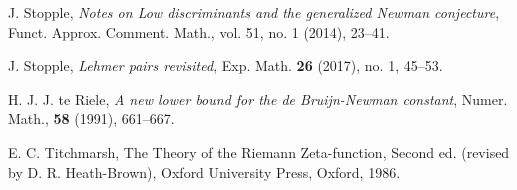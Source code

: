 \documentclass[a4paper,11pt,twoside]{amsart}
\begin{document}
\begin{thebibliography}{99}
J. Stopple, \emph{Notes on Low discriminants and the generalized Newman conjecture}, Funct. Approx. Comment.
Math., vol. 51, no. 1 (2014), 23--41.

J. Stopple, \emph{Lehmer pairs revisited}, Exp. Math. \textbf{26} (2017), no. 1, 45--53. 

H. J. J. te Riele, \emph{A new lower bound for the de Bruijn-Newman constant}, Numer. Math., \textbf{58} (1991), 661--667.

E. C. Titchmarsh, The Theory of the Riemann Zeta-function, Second ed. (revised by D. R. Heath-Brown), Oxford University Press, Oxford, 1986.	


\end{thebibliography} 
\end{document}
